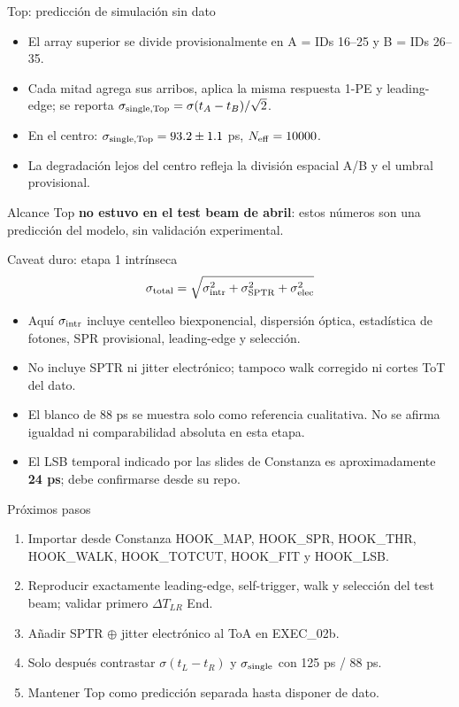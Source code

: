 \documentclass[aspectratio=169]{beamer}
\begin{document}
\begin{frame}{Top: predicción de simulación sin dato}
  \begin{itemize}
    \item El array superior se divide provisionalmente en
      A = IDs 16--25 y B = IDs 26--35.
    \item Cada mitad agrega sus arribos, aplica la misma respuesta 1-PE y
      leading-edge; se reporta
      $\sigma_{\rm single,Top}=\sigma(t_A-t_B)/\sqrt{2}$.
    \item En el centro: $\sigma_{\rm single,Top}=93.2\pm1.1$ ps,
      $N_{\rm eff}=10000$.
    \item La degradación lejos del centro refleja la división espacial A/B y
      el umbral provisional.
  \end{itemize}
  \begin{alertblock}{Alcance}
    Top \textbf{no estuvo en el test beam de abril}: estos números son una
    predicción del modelo, sin validación experimental.
  \end{alertblock}
\end{frame}

\begin{frame}{Caveat duro: etapa 1 intrínseca}
  \[
    \sigma_{\rm total} =
    \sqrt{\sigma_{\rm intr}^2+\sigma_{\rm SPTR}^2+\sigma_{\rm elec}^2}
  \]
  \begin{itemize}
    \item Aquí $\sigma_{\rm intr}$ incluye centelleo biexponencial, dispersión
      óptica, estadística de fotones, SPR provisional, leading-edge y selección.
    \item No incluye SPTR ni jitter electrónico; tampoco walk corregido ni
      cortes ToT del dato.
    \item El blanco de 88 ps se muestra solo como referencia cualitativa.
      No se afirma igualdad ni comparabilidad absoluta en esta etapa.
    \item El LSB temporal indicado por las slides de Constanza es
      aproximadamente \textbf{24 ps}; debe confirmarse desde su repo.
  \end{itemize}
\end{frame}

\begin{frame}{Próximos pasos}
  \begin{enumerate}
    \item Importar desde Constanza HOOK\_MAP, HOOK\_SPR, HOOK\_THR,
      HOOK\_WALK, HOOK\_TOTCUT, HOOK\_FIT y HOOK\_LSB.
    \item Reproducir exactamente leading-edge, self-trigger, walk y selección
      del test beam; validar primero $\Delta T_{LR}$ End.
    \item Añadir SPTR $\oplus$ jitter electrónico al ToA en EXEC\_02b.
    \item Solo después contrastar $\sigma(t_L-t_R)$ y
      $\sigma_{\rm single}$ con 125 ps / 88 ps.
    \item Mantener Top como predicción separada hasta disponer de dato.
  \end{enumerate}
\end{frame}
\end{document}
